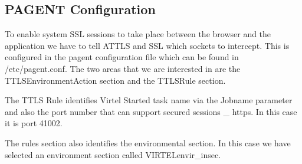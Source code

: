 \documentclass[letterpaper,10pt,english]{sphinxmanual}
\begin{document}
\ignorespaces 

\subsection{PAGENT Configuration}
\label{\detokenize{Customization:pagent-configuration}}\label{\detokenize{Customization:index-112}}
\sphinxAtStartPar
To enable system SSL sessions to take place between the browser and the application we have to tell AT\sphinxhyphen{}TLS and SSL which sockets to intercept. This is configured in the pagent configuration file which can be found in /etc/pagent.conf. The two areas that we are interested in are the TTLSEnvironmentAction section and the TTLSRule section.

\begin{sphinxVerbatim}[commandchars=\\\{\}]
 
     
     
         
         
         
         
         
     


 
     
     
     
     
     
\end{sphinxVerbatim}

\sphinxAtStartPar
The TTLS Rule identifies Virtel Started task name via the Jobname parameter and also the port number that can support secured sessions \_ https. In this case it is port 41002.

\sphinxAtStartPar
The rules section also identifies the environmental section. In this case we have selected an environment section called VIRTELenvir\_insec.
\end{document}
